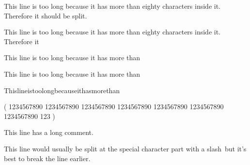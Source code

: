 \documentclass{article}
\begin{document}
This line is too long because it has more than eighty characters inside it.
Therefore it should be split.

This line is too long because it has more than eighty characters inside it.
Therefore it %

This line is too long because it has more than %

This line is too long because it has more than%

Thislineistoolongbecauseithasmorethan%

(
  1234567890 1234567890 1234567890 1234567890 1234567890 1234567890 1234567890
  123
)

This line has a long comment. %


This line would usually be split at the special character part with a
slash\ but it's best to break the line earlier.
\end{document}
